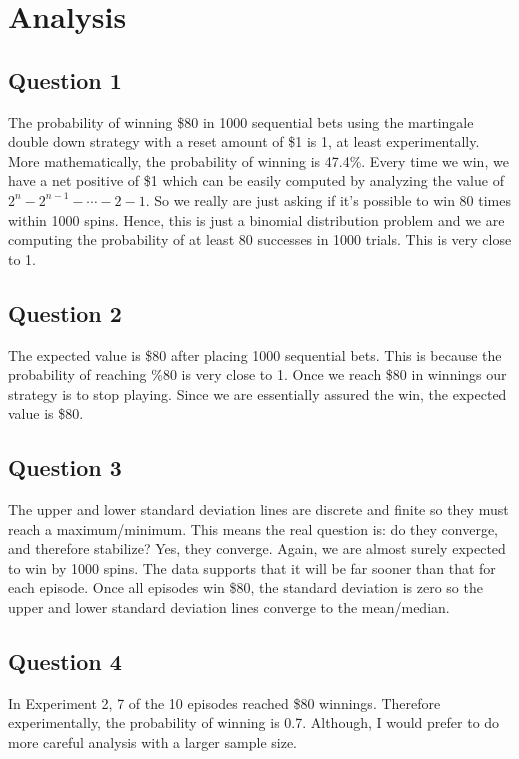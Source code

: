 \documentclass[
	letterpaper, %
]{jdf}
\begin{document}
\section{Analysis}

\subsection{Question 1}
The probability of winning \$80 in 1000 sequential bets using the martingale double down strategy with a reset amount of \$1 is 1, at least experimentally. More mathematically,
the probability of winning is 47.4\%. Every time we win, we have a net positive of \$1 which can be easily computed by analyzing the value of
\(2^n-2^{n-1}-\cdots-2-1\). So we really are just asking if it's possible to win 80 times within 1000 spins. Hence, this is just a binomial distribution problem
and we are computing the probability of at least 80 successes in 1000 trials. This is very close to 1.

\subsection{Question 2}
The expected value is \$80 after placing 1000 sequential bets. This is because the probability of reaching \%80 is very close to 1. Once we reach \$80 in winnings
our strategy is to stop playing. Since we are essentially assured the win, the expected value is \$80.

\subsection{Question 3}
The upper and lower standard deviation lines are discrete and finite so they must reach a maximum/minimum. This means the real question is: do they converge, and therefore stabilize?
Yes, they converge. Again, we are almost surely expected to win by 1000 spins. The data supports that it will be far sooner than that for each episode.
Once all episodes win \$80, the standard deviation is zero so the upper and lower standard deviation lines converge to the mean/median.

\subsection{Question 4}
In Experiment 2, 7 of the 10 episodes reached \$80 winnings. Therefore experimentally, the probability of winning is 0.7. Although, I would prefer to do more careful
analysis with a larger sample size.
\end{document}

